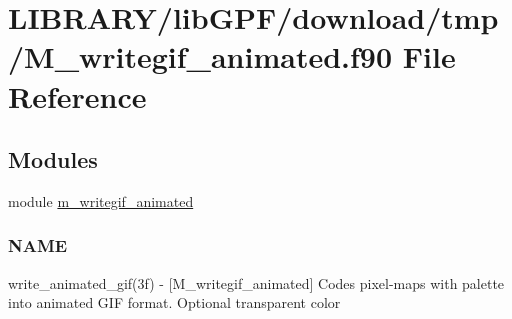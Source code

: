 \hypertarget{M__writegif__animated_8f90}{}\section{L\+I\+B\+R\+A\+R\+Y/lib\+G\+P\+F/download/tmp/\+M\+\_\+writegif\+\_\+animated.f90 File Reference}
\label{M__writegif__animated_8f90}
\subsection*{Modules}
\begin{DoxyCompactItemize}
\item 
module \hyperlink{namespacem__writegif__animated}{m\+\_\+writegif\+\_\+animated}
\begin{DoxyCompactList}\small\item\em \subsubsection*{N\+A\+ME}

write\+\_\+animated\+\_\+gif(3f) -\/ \mbox{[}M\+\_\+writegif\+\_\+animated\mbox{]} Codes pixel-\/maps with palette into animated G\+IF format. Optional transparent color \end{DoxyCompactList}\end{DoxyCompactItemize}
